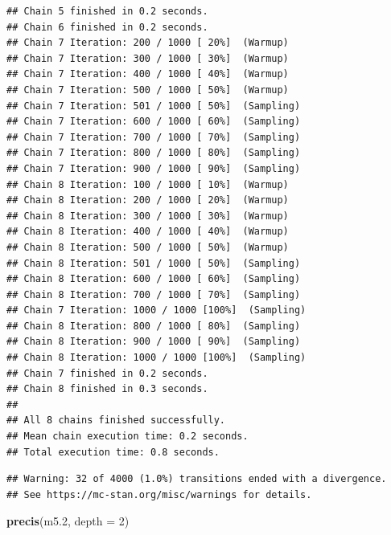 \documentclass[
]{book}
\newenvironment{Shaded}{\begin{snugshade}}{\end{snugshade}}
\newcommand{\AttributeTok}[1]{\textcolor[rgb]{0.13,0.29,0.53}{#1}}
\newcommand{\DecValTok}[1]{\textcolor[rgb]{0.00,0.00,0.81}{#1}}
\newcommand{\FloatTok}[1]{\textcolor[rgb]{0.00,0.00,0.81}{#1}}
\newcommand{\FunctionTok}[1]{\textcolor[rgb]{0.13,0.29,0.53}{\textbf{#1}}}
\newcommand{\NormalTok}[1]{#1}
\begin{document}
\begin{verbatim}
## Chain 5 finished in 0.2 seconds.
## Chain 6 finished in 0.2 seconds.
## Chain 7 Iteration: 200 / 1000 [ 20%]  (Warmup) 
## Chain 7 Iteration: 300 / 1000 [ 30%]  (Warmup) 
## Chain 7 Iteration: 400 / 1000 [ 40%]  (Warmup) 
## Chain 7 Iteration: 500 / 1000 [ 50%]  (Warmup) 
## Chain 7 Iteration: 501 / 1000 [ 50%]  (Sampling) 
## Chain 7 Iteration: 600 / 1000 [ 60%]  (Sampling) 
## Chain 7 Iteration: 700 / 1000 [ 70%]  (Sampling) 
## Chain 7 Iteration: 800 / 1000 [ 80%]  (Sampling) 
## Chain 7 Iteration: 900 / 1000 [ 90%]  (Sampling) 
## Chain 8 Iteration: 100 / 1000 [ 10%]  (Warmup) 
## Chain 8 Iteration: 200 / 1000 [ 20%]  (Warmup) 
## Chain 8 Iteration: 300 / 1000 [ 30%]  (Warmup) 
## Chain 8 Iteration: 400 / 1000 [ 40%]  (Warmup) 
## Chain 8 Iteration: 500 / 1000 [ 50%]  (Warmup) 
## Chain 8 Iteration: 501 / 1000 [ 50%]  (Sampling) 
## Chain 8 Iteration: 600 / 1000 [ 60%]  (Sampling) 
## Chain 8 Iteration: 700 / 1000 [ 70%]  (Sampling) 
## Chain 7 Iteration: 1000 / 1000 [100%]  (Sampling) 
## Chain 8 Iteration: 800 / 1000 [ 80%]  (Sampling) 
## Chain 8 Iteration: 900 / 1000 [ 90%]  (Sampling) 
## Chain 8 Iteration: 1000 / 1000 [100%]  (Sampling) 
## Chain 7 finished in 0.2 seconds.
## Chain 8 finished in 0.3 seconds.
## 
## All 8 chains finished successfully.
## Mean chain execution time: 0.2 seconds.
## Total execution time: 0.8 seconds.
\end{verbatim}

\begin{verbatim}
## Warning: 32 of 4000 (1.0%) transitions ended with a divergence.
## See https://mc-stan.org/misc/warnings for details.
\end{verbatim}

\begin{Shaded}
\begin{Highlighting}[]
\FunctionTok{precis}\NormalTok{(m5}\FloatTok{.2}\NormalTok{, }\AttributeTok{depth =} \DecValTok{2}\NormalTok{)}
\end{Highlighting}
\end{Shaded}
\end{document}
